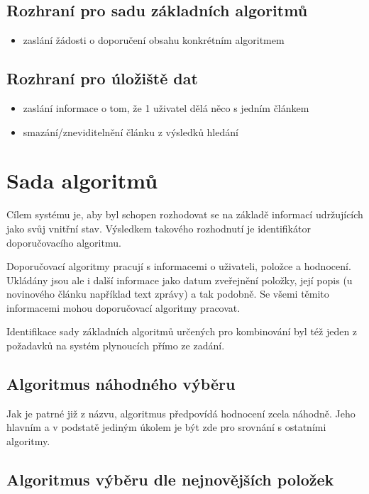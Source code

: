 \documentclass[thesis=M,czech]{FITthesis}[2014/05/07]
\begin{document}
\subsection{Rozhraní pro sadu základních algoritmů}

\begin{itemize}
	\item zaslání žádosti o doporučení obsahu konkrétním algoritmem
\end{itemize}

\subsection{Rozhraní pro úložiště dat}

\begin{itemize}
\item zaslání informace o tom, že 1 uživatel dělá něco s jedním článkem
	\item smazání/zneviditelnění článku z výsledků hledání
\end{itemize}
			
\section{Sada algoritmů}

Cílem systému je, aby byl schopen rozhodovat se na základě informací udržujících jako svůj vnitřní stav. Výsledkem takového rozhodnutí je identifikátor doporučovacího algoritmu. 

Doporučovací algoritmy pracují s informacemi o uživateli, položce a hodnocení. Ukládány jsou ale i další informace jako datum zveřejnění položky, její popis (u novinového článku například text zprávy) a tak podobně. Se všemi těmito informacemi mohou doporučovací algoritmy pracovat. 

Identifikace sady základních algoritmů určených pro kombinování byl též jeden z požadavků na systém plynoucích přímo ze zadání. 

\subsection{Algoritmus náhodného výběru}

Jak je patrné již z názvu, algoritmus předpovídá hodnocení zcela náhodně. Jeho hlavním a v podstatě jediným úkolem je být zde pro srovnání s ostatními algoritmy. 

\subsection{Algoritmus výběru dle nejnovějších položek}
\end{document}
